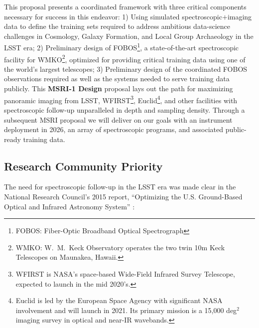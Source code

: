 \documentclass[oneside,11pt]{amsart}
\newcommand{\comment}[2][todo]{{\color{#1}[[{\bf #2}]]}}
\begin{document}
This proposal presents a coordinated framework with three critical components necessary for success in
this endeavor: 1) Using simulated spectroscopic$+$imaging data to define the training sets required to address
ambitious data-science challenges in Cosmology, Galaxy Formation, and Local Group Archaeology in the LSST era; 2)
Preliminary design of FOBOS\footnote{FOBOS: Fiber-Optic Broadband Optical Spectrograph}, a state-of-the-art
spectroscopic facility for WMKO\footnote{WMKO: W.~M.\ Keck Observatory operates the two twin 10m Keck Telescopes on
Maunakea, Hawaii.}, optimized for providing critical training data using one of the world's largest telescopes; 3)
Preliminary design of the coordinated FOBOS observations required as well as the systems needed to serve training data
publicly.  This {\bf MSRI-1 Design} proposal lays out the path for maximizing panoramic imaging from LSST,
WFIRST\footnote{WFIRST is NASA's space-based Wide-Field Infrared Survey Telescope, expected to launch in the mid
2020's.}, Euclid\footnote{Euclid is led by the European Space Agency with significant NASA involvement and will launch
in 2021. Its primary mission is a 15,000 deg$^2$ imaging survey in optical and near-IR wavebands.}, and other
facilities with spectroscopic follow-up unparalleled in depth and sampling density.  Through a subsequent MSRI proposal
we will deliver on our goals with an instrument deployment in 2026, an array of spectroscopic programs, and associated
public-ready training data.%

\subsection{Research Community Priority} 
\label{sec:community}

The need for spectroscopic follow-up in the LSST era was made clear in
the National Research Council's 2015 report, ``Optimizing the U.S.
Ground-Based Optical and Infrared Astronomy System'' \citep{NAP21722}:
%
\noindent{}
\end{document}
